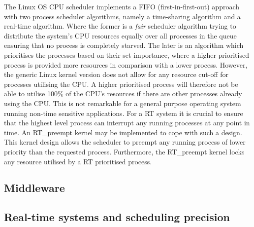 The Linux OS CPU scheduler implements a FIFO (first-in-first-out) approach with two process scheduler algorithms, namely a time-sharing algorithm and a real-time algorithm. Where the former is a \textit{fair} scheduler algorithm trying to distribute the system's CPU resources equally over all processes in the queue ensuring that no process is completely starved. The later is an algorithm which prioritises the processes based on their set importance, where a higher prioritised process is provided more resources in comparison with a lower process. However, the generic Linux kernel version does not allow for any resource cut-off for processes utilising the CPU. A higher prioritised process will therefore not be able to utilise 100\% of the CPU's resources if there are other processes already using the CPU. This is not remarkable for a general purpose operating system running non-time sensitive applications. For a RT system it is crucial to ensure that the highest level process can interrupt any running processes at any point in time. An RT\_preempt kernel may be implemented to cope with such a design. This kernel design allows the scheduler to preempt any running process of lower priority than the requested process. Furthermore, the RT\_preempt kernel locks any resource utilised by a RT prioritised process.\\

\subsection{Middleware}



\subsection{Real-time systems and scheduling precision}

